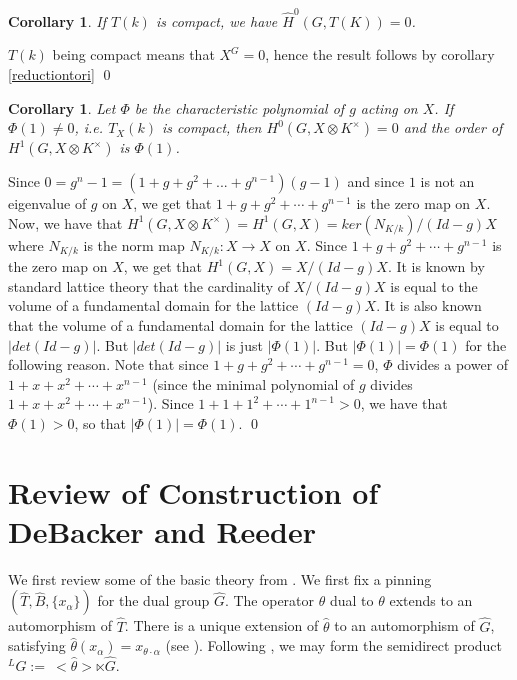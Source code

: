 \documentclass[11pt]{amsart}
\theoremstyle{plain}
\newtheorem{corollary}[theorem]{Corollary}
\theoremstyle{definition}
\begin{document}
\begin{corollary}
If $T(k)$ is compact, we have $\hat{H}^0(G, T(K)) = 0$.
\end{corollary}

\proof
$T(k)$ being compact means that $X^G = 0$, hence the result follows by corollary \ref{reductiontori}
\qed

\begin{corollary}
  Let $\Phi$ be the characteristic polynomial of $g$ acting on $X$. If
  $\Phi(1)\neq 0$, i.e. $T_X(k)$ is compact, then $H^0(G, X\otimes
  K^{\times})=0$ and the order of $H^1(G, X\otimes K^{\times})$ is
  $\Phi(1)$.
\end{corollary}

\proof

Since $0 = g^n - 1 = (1 + g + g^2 + ... + g^{n-1})(g-1)$ and since $1$
is not an eigenvalue of $g$ on $X$, we get that $1 + g + g^2 + \cdots + g^{n-1}$
is the zero map on $X$.  Now, we have that
$H^1(G, X\otimes K^{\times}) = H^1(G, X) = ker(N_{K/k}) / (Id - g)X$
where $N_{K/k}$ is the norm map $N_{K/k} : X \rightarrow X$ on $X$.
Since $1 + g + g^2 + \cdots + g^{n-1}$ is the zero map on $X$,
we get that $H^1(G, X) = X / (Id - g)X$.  It is known by standard lattice
theory that the cardinality of $X / (Id - g)X$ is equal to the volume of
a fundamental domain for the lattice $(Id - g)X$.  It is also known that
the volume of a fundamental domain for the lattice $(Id - g)X$ is equal to
$|det(Id - g)|$.  But $|det(Id - g)|$ is just $|\Phi(1)|$.  But
$|\Phi(1)| = \Phi(1)$ for the following reason.  Note that since
$1 + g + g^2 + \cdots + g^{n-1} = 0$, $\Phi$ divides a power of
$1 + x + x^2 + \cdots + x^{n-1}$ (since the minimal polynomial of $g$
divides $1 + x + x^2 + \cdots + x^{n-1}$).  Since
$1 + 1 + 1^2 + \cdots + 1^{n-1} > 0$, we have that $\Phi(1) > 0$,
so that $|\Phi(1)| = \Phi(1)$.
\qed

\section{Review of Construction of DeBacker and Reeder}\label{preliminaries}

We first review some of the basic theory from \cite{debackerreeder}.
We first fix a pinning $(\hat{T}, \hat{B}, \{x_{\alpha} \})$ for the
dual group $\hat{G}$.  The operator $\hat{\theta}$ dual to $\theta$
extends to an automorphism of $\hat{T}$.  There is a unique extension
of $\hat{\theta}$ to an automorphism of $\hat{G}$, satisfying
$\hat{\theta}(x_{\alpha}) = x_{\theta \cdot \alpha}$ (see
\cite[section 3.2]{debackerreeder}).  Following \cite{debackerreeder},
we may form the semidirect product ${}^L G := \ <\hat{\theta}> \ltimes \hat{G}$.
\end{document}
